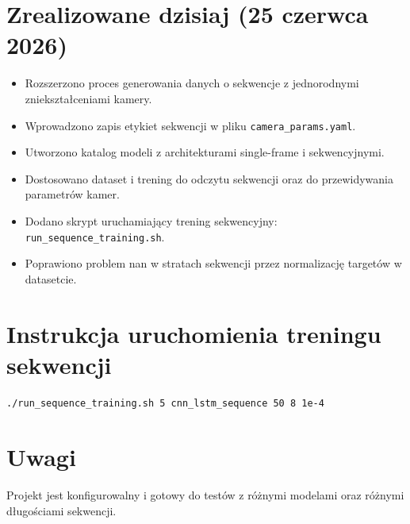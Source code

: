 \documentclass[11pt,a4paper]{article}
\begin{document}
\section{Zrealizowane dzisiaj (25 czerwca 2026)}
\begin{itemize}[leftmargin=*]
    \item Rozszerzono proces generowania danych o sekwencje z jednorodnymi zniekształceniami kamery.
    \item Wprowadzono zapis etykiet sekwencji w pliku \texttt{camera_params.yaml}.
    \item Utworzono katalog modeli z architekturami single-frame i sekwencyjnymi.
    \item Dostosowano dataset i trening do odczytu sekwencji oraz do przewidywania parametrów kamer.
    \item Dodano skrypt uruchamiający trening sekwencyjny: \texttt{run_sequence_training.sh}.
    \item Poprawiono problem nan w stratach sekwencji przez normalizację targetów w datasetcie.
\end{itemize}

\section{Instrukcja uruchomienia treningu sekwencji}
\begin{verbatim}
./run_sequence_training.sh 5 cnn_lstm_sequence 50 8 1e-4
\end{verbatim}

\section*{Uwagi}
Projekt jest konfigurowalny i gotowy do testów z różnymi modelami oraz różnymi długościami sekwencji.
\end{document}
